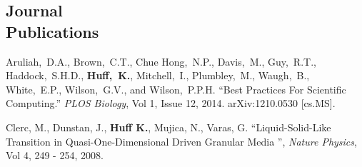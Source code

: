 \documentclass[margin,line]{resume}
\begin{document}
\begin{resume}
    \section{\mysidestyle Journal\\Publications}
      \begin{bibenum}
        \item Aruliah,~D.A., Brown,~C.T., Chue Hong,~N.P., Davis,~M., Guy,~R.T., 
          Haddock,~S.H.D., \textbf{Huff,~K.}, Mitchell,~I., Plumbley,~M., Waugh,~B., 
          White,~E.P., Wilson,~G.V., and Wilson,~P.P.H.  ``Best Practices For 
          Scientific Computing.'' \textsl{PLOS Biology}, Vol 1, Issue 12, 2014. 
          arXiv:1210.0530 [cs.MS].
        \item Clerc, M., Dunstan, J., \textbf{Huff K.}, Mujica, N., Varas, G. 
          ``Liquid-Solid-Like Transition in Quasi-One-Dimensional Driven 
          Granular Media '',  \textsl{Nature Physics}, Vol 4, 249 - 254, 2008.
      \end{bibenum}

\end{resume}
\end{document}
